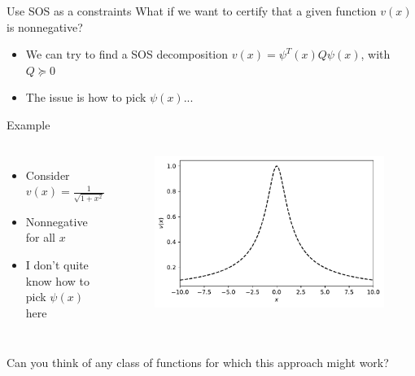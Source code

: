 \documentclass[aspectratio=169]{beamer}
\begin{document}
\begin{frame}{Use SOS as a constraints}
What if we want to certify that a given function $v(x)$ is nonnegative?
\pause
\begin{itemize}
\item
We can try to find a SOS decomposition $v(x) = \psi^T(x) Q \psi(x)$, with $Q \succeq 0$
\item
The issue is how to pick $\psi(x)$...
\end{itemize}
\pause
\begin{block}{Example}
\begin{columns}
\begin{itemize}
\item
Consider $v(x) = \frac{1}{\sqrt{1 + x^2}}$
\item
Nonnegative for all $x$
\item
I don't quite know how to pick $\psi(x)$ here
\end{itemize}
\begin{figure}
\includegraphics[width=\columnwidth]{figures/imq.pdf}
\end{figure}
\end{columns}
\end{block}
\pause
Can you think of any class of functions for which this approach might work?
\end{frame}
\end{document}
